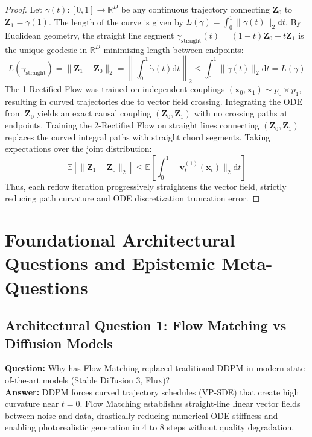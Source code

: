 \documentclass[11pt,a4paper]{article}
\theoremstyle{definition}
\begin{document}
\begin{proof}
Let $\gamma(t): [0, 1] \to \mathbb{R}^D$ be any continuous trajectory connecting $\mathbf{Z}_0$ to $\mathbf{Z}_1 = \gamma(1)$. The length of the curve is given by $L(\gamma) = \int_0^1 \|\dot{\gamma}(t)\|_2 \mathrm{d}t$.
By Euclidean geometry, the straight line segment $\gamma_{\text{straight}}(t) = (1 - t)\mathbf{Z}_0 + t\mathbf{Z}_1$ is the unique geodesic in $\mathbb{R}^D$ minimizing length between endpoints:
{\boldmath
\begin{equation}
L(\gamma_{\text{straight}}) = \|\mathbf{Z}_1 - \mathbf{Z}_0\|_2 = \left\| \int_0^1 \dot{\gamma}(t) \mathrm{d}t \right\|_2 \le \int_0^1 \|\dot{\gamma}(t)\|_2 \mathrm{d}t = L(\gamma)
\end{equation}
}
The 1-Rectified Flow was trained on independent couplings $(\mathbf{x}_0, \mathbf{x}_1) \sim p_0 \times p_1$, resulting in curved trajectories due to vector field crossing.
Integrating the ODE from $\mathbf{Z}_0$ yields an exact causal coupling $(\mathbf{Z}_0, \mathbf{Z}_1)$ with no crossing paths at endpoints.
Training the 2-Rectified Flow on straight lines connecting $(\mathbf{Z}_0, \mathbf{Z}_1)$ replaces the curved integral paths with straight chord segments.
Taking expectations over the joint distribution:
{\boldmath
\begin{equation}
\mathbb{E}\left[ \|\mathbf{Z}_1 - \mathbf{Z}_0\|_2 \right] \le \mathbb{E}\left[ \int_0^1 \|\mathbf{v}^{(1)}_t(\mathbf{x}_t)\|_2 \mathrm{d}t \right]
\end{equation}
}
Thus, each reflow iteration progressively straightens the vector field, strictly reducing path curvature and ODE discretization truncation error.
\end{proof}

\section{Foundational Architectural Questions and Epistemic Meta-Questions}

\subsection{Architectural Question 1: Flow Matching vs Diffusion Models}
\textbf{Question:} Why has Flow Matching replaced traditional DDPM in modern state-of-the-art models (Stable Diffusion 3, Flux)?\\
\textbf{Answer:} DDPM forces curved trajectory schedules (VP-SDE) that create high curvature near $t = 0$. Flow Matching establishes straight-line linear vector fields between noise and data, drastically reducing numerical ODE stiffness and enabling photorealistic generation in 4 to 8 steps without quality degradation.
\end{document}
